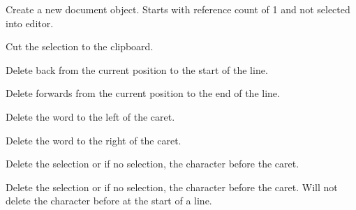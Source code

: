 \label{wxstyledtextctrlcreatedocument}


Create a new document object.
Starts with reference count of 1 and not selected into editor.


\label{wxstyledtextctrlcut}


Cut the selection to the clipboard.


\label{wxstyledtextctrldellineleft}


Delete back from the current position to the start of the line.


\label{wxstyledtextctrldellineright}


Delete forwards from the current position to the end of the line.


\label{wxstyledtextctrldelwordleft}


Delete the word to the left of the caret.


\label{wxstyledtextctrldelwordright}


Delete the word to the right of the caret.


\label{wxstyledtextctrldeleteback}


Delete the selection or if no selection, the character before the caret.


\label{wxstyledtextctrldeletebacknotline}


Delete the selection or if no selection, the character before the caret.
Will not delete the character before at the start of a line.


\label{wxstyledtextctrldodragover}


